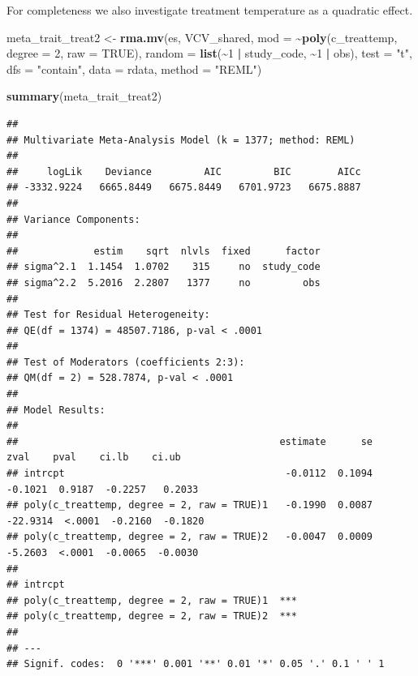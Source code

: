 \documentclass[
]{article}
\newenvironment{Shaded}{\begin{snugshade}}{\end{snugshade}}
\newcommand{\AttributeTok}[1]{\textcolor[rgb]{0.13,0.29,0.53}{#1}}
\newcommand{\ConstantTok}[1]{\textcolor[rgb]{0.56,0.35,0.01}{#1}}
\newcommand{\DecValTok}[1]{\textcolor[rgb]{0.00,0.00,0.81}{#1}}
\newcommand{\FunctionTok}[1]{\textcolor[rgb]{0.13,0.29,0.53}{\textbf{#1}}}
\newcommand{\NormalTok}[1]{#1}
\newcommand{\OtherTok}[1]{\textcolor[rgb]{0.56,0.35,0.01}{#1}}
\newcommand{\SpecialCharTok}[1]{\textcolor[rgb]{0.81,0.36,0.00}{\textbf{#1}}}
\newcommand{\StringTok}[1]{\textcolor[rgb]{0.31,0.60,0.02}{#1}}
\begin{document}
For completeness we also investigate treatment temperature as a
quadratic effect.

\begin{Shaded}
\begin{Highlighting}[]
\NormalTok{meta\_trait\_treat2 }\OtherTok{\textless{}{-}} \FunctionTok{rma.mv}\NormalTok{(es, VCV\_shared, }\AttributeTok{mod =} \SpecialCharTok{\textasciitilde{}}\FunctionTok{poly}\NormalTok{(c\_treattemp,}
    \AttributeTok{degree =} \DecValTok{2}\NormalTok{, }\AttributeTok{raw =} \ConstantTok{TRUE}\NormalTok{), }\AttributeTok{random =} \FunctionTok{list}\NormalTok{(}\SpecialCharTok{\textasciitilde{}}\DecValTok{1} \SpecialCharTok{|}\NormalTok{ study\_code, }\SpecialCharTok{\textasciitilde{}}\DecValTok{1} \SpecialCharTok{|}
\NormalTok{    obs), }\AttributeTok{test =} \StringTok{"t"}\NormalTok{, }\AttributeTok{dfs =} \StringTok{"contain"}\NormalTok{, }\AttributeTok{data =}\NormalTok{ rdata, }\AttributeTok{method =} \StringTok{"REML"}\NormalTok{)}
\end{Highlighting}
\end{Shaded}

\begin{Shaded}
\begin{Highlighting}[]
\FunctionTok{summary}\NormalTok{(meta\_trait\_treat2)}
\end{Highlighting}
\end{Shaded}

\begin{verbatim}
## 
## Multivariate Meta-Analysis Model (k = 1377; method: REML)
## 
##     logLik    Deviance         AIC         BIC        AICc   
## -3332.9224   6665.8449   6675.8449   6701.9723   6675.8887   
## 
## Variance Components:
## 
##             estim    sqrt  nlvls  fixed      factor 
## sigma^2.1  1.1454  1.0702    315     no  study_code 
## sigma^2.2  5.2016  2.2807   1377     no         obs 
## 
## Test for Residual Heterogeneity:
## QE(df = 1374) = 48507.7186, p-val < .0001
## 
## Test of Moderators (coefficients 2:3):
## QM(df = 2) = 528.7874, p-val < .0001
## 
## Model Results:
## 
##                                             estimate      se      zval    pval    ci.lb    ci.ub 
## intrcpt                                      -0.0112  0.1094   -0.1021  0.9187  -0.2257   0.2033 
## poly(c_treattemp, degree = 2, raw = TRUE)1   -0.1990  0.0087  -22.9314  <.0001  -0.2160  -0.1820 
## poly(c_treattemp, degree = 2, raw = TRUE)2   -0.0047  0.0009   -5.2603  <.0001  -0.0065  -0.0030 
##                                                 
## intrcpt                                         
## poly(c_treattemp, degree = 2, raw = TRUE)1  *** 
## poly(c_treattemp, degree = 2, raw = TRUE)2  *** 
## 
## ---
## Signif. codes:  0 '***' 0.001 '**' 0.01 '*' 0.05 '.' 0.1 ' ' 1
\end{verbatim}
\end{document}
